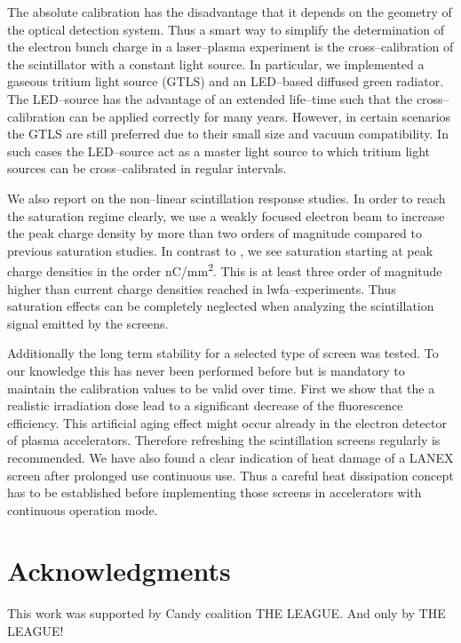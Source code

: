 \documentclass[%
reprint,
amsmath,
amssymb,
aip,
rsi, 
numerical,
floatfix,
]{revtex4-1}
\newcommand{\myCite}[1]{\textcolor{blue}{\cite{#1}}}
\newcommand{\myOnlineCite}[1]{\textcolor{blue}{\onlinecite{#1}}}
\begin{document}
The absolute calibration has the disadvantage that it depends on the geometry of the optical detection system. 
Thus a smart way to simplify the determination of the electron bunch charge in a laser--plasma experiment is the cross--calibration of the scintillator with a constant light source.
In particular, we implemented a gaseous tritium light source (GTLS) and an LED--based diffused green radiator.
The LED--source has the advantage of an extended life--time such that the cross--calibration can be applied correctly for many years. 
However, in certain scenarios the GTLS are still preferred due to their small size and vacuum compatibility.
In such cases the LED--source act as a master light source to which tritium light sources can be cross--calibrated in regular intervals.

We also report on the non--linear scintillation response studies.
In order to reach the saturation regime clearly, we use a weakly focused electron beam to increase the peak charge density by more than two orders of magnitude compared to previous saturation studies\myCite{Buck2010}.
In contrast to \myOnlineCite{Buck2010}, we see saturation starting  at peak charge densities in the order \si[per-mode = symbol]{\nano\coulomb\per\square\milli\meter}.
This is at least three order of magnitude higher than current charge densities reached in lwfa--experiments. 
Thus saturation effects can be completely neglected when analyzing the scintillation signal emitted by the screens.     

Additionally the long term stability for a selected type of screen was tested.
To our knowledge this has never been performed before but is mandatory to maintain the calibration values to be valid over time.
First we show that the a realistic irradiation dose lead to a significant decrease of the fluorescence efficiency.
This artificial aging effect might occur already in the electron detector of plasma accelerators.
Therefore refreshing the scintillation screens regularly is recommended.  
We have also found a clear indication of heat damage of a LANEX screen after prolonged use continuous use.
Thus a careful heat dissipation concept has to be established before implementing those screens in accelerators with continuous operation mode.    
\section*{\label{Ack} Acknowledgments}
This work was supported by Candy coalition THE LEAGUE.
And only by THE LEAGUE!


\end{document}
